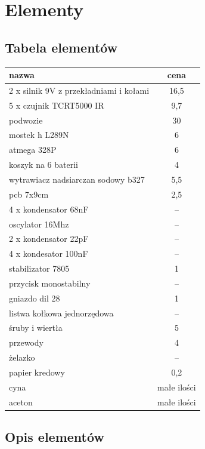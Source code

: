 \documentclass[a4paper,11pt]{article}
\begin{document}
\section{Elementy}
\subsection{Tabela elementów}

\begin{center}

\begin{tabular}{|l | c|}

	\hline
	nazwa 										& cena			\\ \hline
	2 x silnik 9V z przekładniami i kołami 		& 16,5			\\
	5 x czujnik	TCRT5000 IR						& 9,7			\\
	podwozie										& 30				\\
	mostek h L289N								& 6				\\
	atmega 328P									& 6				\\
	koszyk na 6 baterii							& 4				\\
	wytrawiacz nadsiarczan sodowy b327			& 5,5			\\
	pcb	7x9cm									& 2,5			\\
	4 x kondensator 68nF							& --				\\
	oscylator 16Mhz								& --				\\
	2 x kondensator 22pF							& --				\\
	4 x kondesator 100nF							& --				\\
	stabilizator 7805							& 1				\\
	przycisk monostabilny						& --				\\
	gniazdo dil 28								& 1				\\
	listwa kołkowa jednorzędowa					& --				\\
	śruby i wiertła								& 5				\\
	przewody										& 4				\\
	żelazko										& --				\\
	papier kredowy								& 0,2			\\
	cyna											& małe ilości	\\
	aceton										& małe ilości	\\
	\hline
\end{tabular}

\end{center}

\subsection{Opis elementów}
\end{document}
